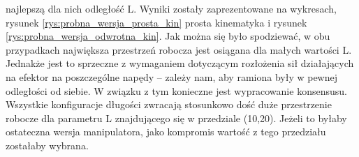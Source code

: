 \documentclass[printmode]{mgr}
\begin{document}
najlepszą dla nich odległość L. Wyniki zostały zaprezentowane na wykresach, rysunek \ref{rys:probna_wersja_prosta_kin} prosta kinematyka
i rysunek \ref{rys:probna_wersja_odwrotna_kin}. Jak można się było spodziewać, w obu przypadkach największa przestrzeń robocza jest
osiągana dla małych wartości L. Jednakże jest to sprzeczne z wymaganiem dotyczącym rozłożenia sił działających na efektor na
poszczególne napędy -- zależy nam, aby ramiona były w pewnej odległości od siebie. W związku z tym konieczne jest wypracowanie konsensusu.
Wszystkie konfiguracje długości zwracają stosunkowo dość duże przestrzenie robocze dla parametru L znajdującego się w przedziale (10,20).
Jeżeli to byłaby ostateczna wersja manipulatora, jako kompromis wartość z tego przedziału zostałaby wybrana.

\begin{figure}[tp]
  \setlength{\unitlength}{1.0cm}
  \centering
	 \\
	\subfigure[L=30: l1=20, l2=30, l3=50, l4=0]{
}
\end{figure}
\end{document}
